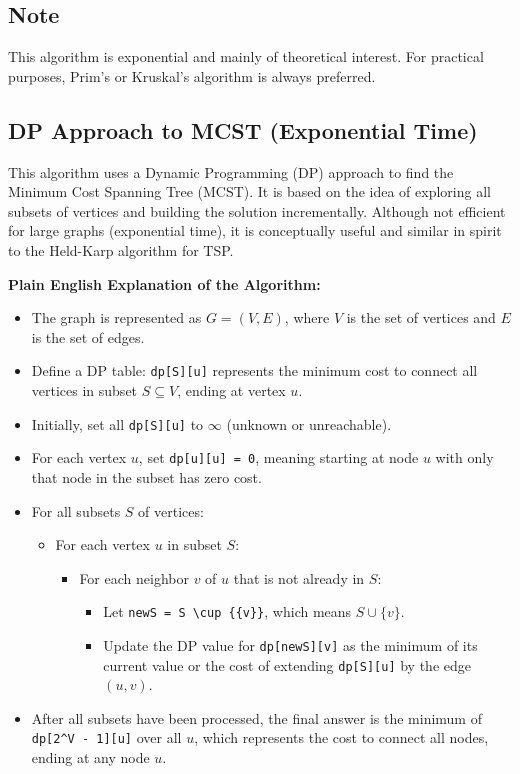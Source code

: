 \documentclass[a4paper,14pt]{extarticle}
\begin{document}
\subsection*{Note}
This algorithm is exponential and mainly of theoretical interest.
For practical purposes, Prim’s or Kruskal’s algorithm is always preferred.

\newpage
\subsection*{DP Approach to MCST (Exponential Time)}

This algorithm uses a Dynamic Programming (DP) approach to find the Minimum Cost Spanning Tree (MCST). It is based on the idea of exploring all subsets of vertices and building the solution incrementally. Although not efficient for large graphs (exponential time), it is conceptually useful and similar in spirit to the Held-Karp algorithm for TSP.

\vspace{1em}
\textbf{Plain English Explanation of the Algorithm:}
\begin{itemize}
    \item The graph is represented as \(G = (V, E)\), where \(V\) is the set of vertices and \(E\) is the set of edges.
    \item Define a DP table: \texttt{dp[S][u]} represents the minimum cost to connect all vertices in subset \(S \subseteq V\), ending at vertex \(u\).
    \item Initially, set all \texttt{dp[S][u]} to \(\infty\) (unknown or unreachable).
    \item For each vertex \(u\), set \texttt{dp[\textbraceleft u\textbraceright][u] = 0}, meaning starting at node \(u\) with only that node in the subset has zero cost.
    \item For all subsets \(S\) of vertices:
    \begin{itemize}
        \item For each vertex \(u\) in subset \(S\):
        \begin{itemize}
            \item For each neighbor \(v\) of \(u\) that is not already in \(S\):
            \begin{itemize}
                \item Let \texttt{newS = S \textbackslash{}cup \{\{v\}\}}, which means \(S \cup \{v\}\).
                \item Update the DP value for \texttt{dp[newS][v]} as the minimum of its current value or the cost of extending \texttt{dp[S][u]} by the edge \((u,v)\).
            \end{itemize}
        \end{itemize}
    \end{itemize}
    \item After all subsets have been processed, the final answer is the minimum of \texttt{dp[2\^{}V - 1][u]} over all \(u\), which represents the cost to connect all nodes, ending at any node \(u\).
\end{itemize}
\end{document}
